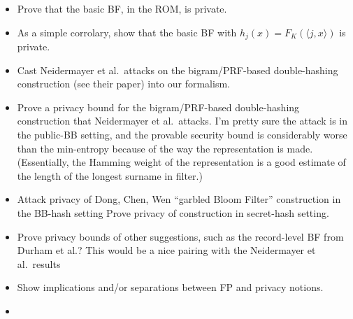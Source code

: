 \begin{itemize}
\item Prove that the basic BF, in the ROM, is private.   

\item As a simple corrolary, show that the basic BF with $h_j(x)=F_K(\langle j,x \rangle)$ is private.  

\item Cast Neidermayer et al.\ attacks on the bigram/PRF-based double-hashing construction (see their paper) into our formalism.   

\item Prove a privacy bound for the bigram/PRF-based double-hashing construction that Neidermayer et al.\ attacks. I'm pretty sure the attack is in the public-BB setting, and the provable security bound is considerably worse than the min-entropy because of the way the representation is made.  (Essentially, the Hamming weight of the representation is a good estimate of the length of the longest surname in filter.)  

\item Attack privacy of Dong, Chen, Wen ``garbled Bloom Filter'' construction in the BB-hash setting   Prove privacy of construction in secret-hash setting.  

\item Prove privacy bounds of other suggestions, such as the record-level BF from Durham et al.?  This would be a nice pairing with the Neidermayer et al.\ results

\item Show implications and/or separations between FP and privacy notions.

\item {}
\end{itemize}